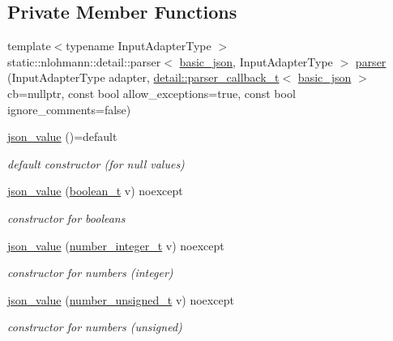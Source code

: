 \subsection*{Private Member Functions}
\begin{DoxyCompactItemize}
\item 
{\footnotesize template$<$typename Input\+Adapter\+Type $>$ }\\static\+::nlohmann\+::detail\+::parser$<$ \hyperlink{classnlohmann_1_1basic__json}{basic\+\_\+json}, Input\+Adapter\+Type $>$ \hyperlink{classnlohmann_1_1basic__json_aaa5b1a16260634ed7b6c6a44f39c4d8a}{parser} (Input\+Adapter\+Type adapter, \hyperlink{namespacenlohmann_1_1detail_a9980144ad77e50ae944d1fe797ceec08}{detail\+::parser\+\_\+callback\+\_\+t}$<$ \hyperlink{classnlohmann_1_1basic__json}{basic\+\_\+json} $>$cb=nullptr, const bool allow\+\_\+exceptions=true, const bool ignore\+\_\+comments=false)
\item 
\hyperlink{classnlohmann_1_1basic__json_abcfe744b08e2cd81508ce9bf7ebc86cf}{json\+\_\+value} ()=default
\begin{DoxyCompactList}\small\item\em default constructor (for null values) \end{DoxyCompactList}\item 
\hyperlink{classnlohmann_1_1basic__json_a8ff30e37ec09ce661d0fed77e3e2e1f3}{json\+\_\+value} (\hyperlink{classnlohmann_1_1basic__json_a44fd1a12c9c54623c942b430e7a72937}{boolean\+\_\+t} v) noexcept
\begin{DoxyCompactList}\small\item\em constructor for booleans \end{DoxyCompactList}\item 
\hyperlink{classnlohmann_1_1basic__json_a3023fcecbe85032b7048499f7bfc4ada}{json\+\_\+value} (\hyperlink{classnlohmann_1_1basic__json_a11e390944da90db83089eb2426a749d3}{number\+\_\+integer\+\_\+t} v) noexcept
\begin{DoxyCompactList}\small\item\em constructor for numbers (integer) \end{DoxyCompactList}\item 
\hyperlink{classnlohmann_1_1basic__json_a400ee8e0f051b9692692798906dc4654}{json\+\_\+value} (\hyperlink{classnlohmann_1_1basic__json_ae09af9c23351b7245d9be4d1b2035fef}{number\+\_\+unsigned\+\_\+t} v) noexcept
\begin{DoxyCompactList}\small\item\em constructor for numbers (unsigned) \end{DoxyCompactList}\item 

\end{DoxyCompactItemize}
